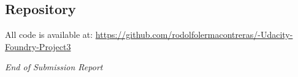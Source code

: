 \documentclass[11pt,a4paper]{article}
\begin{document}
\subsection{Repository}

All code is available at: \url{https://github.com/rodolfolermacontreras/-Udacity-Foundry-Project3}

\vspace{1cm}

\begin{center}
\textit{End of Submission Report}
\end{center}
\end{document}
